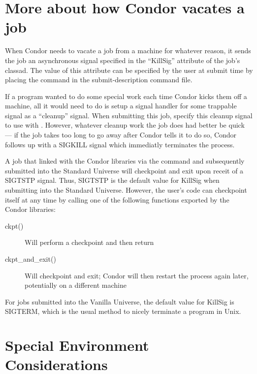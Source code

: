 \section{\label{sec:Vacate-Explained}
More about how Condor vacates a job}

When Condor needs to vacate a job from a machine for whatever reason, it
sends the job an asynchronous signal specified in the ``KillSig''
attribute of the job's classad.  The value of this attribute can be specified by
the user at submit time by placing the  command in the
 submit-description command file.  

If a program wanted to do some special work each time
Condor kicks them off a machine, all it would need to do is setup a
signal handler for some trappable signal as a ``cleanup'' signal.  When
submitting this job, specify this cleanup signal to use with
.  However, whatever cleanup work the job does had better be quick
--- if the job takes too long to go away after Condor tells it to do so, Condor
follows up with a SIGKILL signal which immediatly terminates the
process.

A job that linked with the Condor libraries via the 
command and subsequently submitted into the Standard Universe 
will checkpoint and exit upon receit of a SIGTSTP signal.  Thus, SIGTSTP is
the default value for KillSig when submitting into the Standard
Universe.  However, the user's code can checkpoint itself at any time
by calling one of the following functions exported by the Condor libraries:
\begin{description}
\item[ckpt()] Will perform a checkpoint and then return
\item[ckpt\_and\_exit()] Will checkpoint and exit; Condor will then
restart the process again later, potentially on a different machine
\end{description}

For jobs submitted into the Vanilla Universe, the default value for
KillSig is SIGTERM, which is the usual method to nicely terminate a
program in Unix.

\section{Special Environment Considerations}

